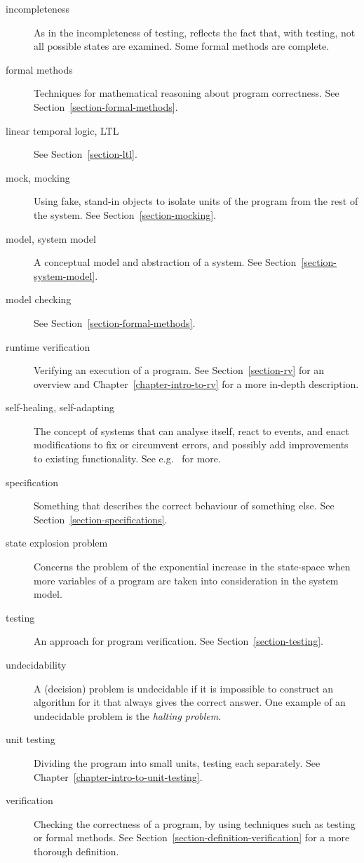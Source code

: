 \documentclass[a4paper,11pt]{kth-mag}
\begin{document}
\begin{description}
  \item[incompleteness] As in the incompleteness of testing, reflects the fact
    that, with testing, not all possible states are examined. Some formal
    methods are complete.

  \item[formal methods] Techniques for mathematical reasoning about program
    correctness. See Section~\ref{section-formal-methods}.

  \item[linear temporal logic, LTL] See Section~\ref{section-ltl}.

  \item[mock, mocking] Using fake, stand-in objects to isolate units of the
    program from the rest of the system. See Section~\ref{section-mocking}.

  \item[model, system model] A conceptual model and abstraction of a system.
    See Section~\ref{section-system-model}.

  \item[model checking] See Section~\ref{section-formal-methods}.

  \item[runtime verification] Verifying an execution of a program. See
    Section~\ref{section-rv} for an overview and
    Chapter~\ref{chapter-intro-to-rv} for a more in-depth description.

  \item[self-healing, self-adapting] The concept of systems that can analyse
    itself, react to events, and enact modifications to fix or circumvent
    errors, and possibly add improvements to existing functionality. See e.g.\
    \cite{huebscher08survey} for more.

  \item[specification] Something that describes the correct behaviour of
    something else. See Section~\ref{section-specifications}.

  \item[state explosion problem] Concerns the problem of the exponential
    increase in the state-space when more variables of a program are taken into
    consideration in the system model.

  \item[testing] An approach for program verification. See
    Section~\ref{section-testing}.

  \item[undecidability] A (decision) problem is undecidable if it is impossible
    to construct an algorithm for it that always gives the correct answer. One
    example of an undecidable problem is the \textit{halting problem}.

  \item[unit testing] Dividing the program into small units, testing each
    separately. See Chapter~\ref{chapter-intro-to-unit-testing}.

  \item[verification] Checking the correctness of a program, by using
    techniques such as testing or formal methods. See
    Section~\ref{section-definition-verification} for a more thorough
    definition.
\end{description}
\end{document}
